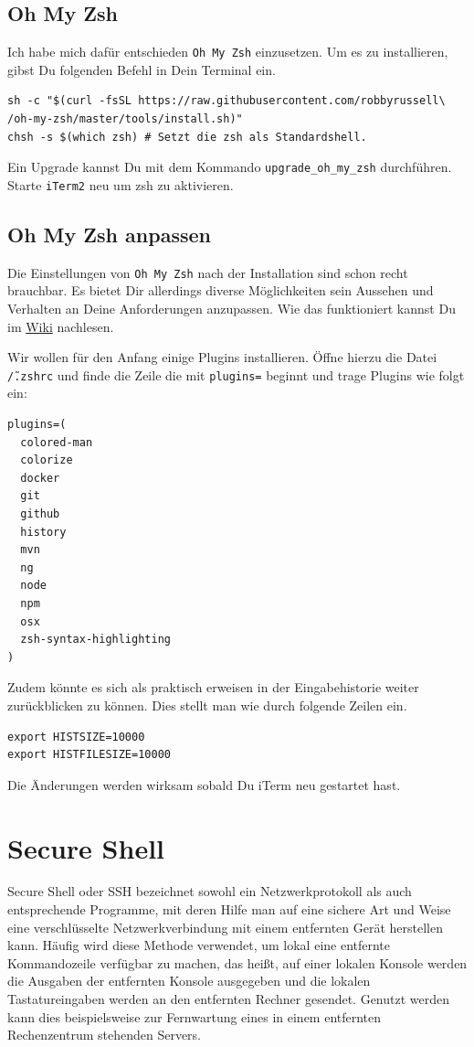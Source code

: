 \documentclass[]{article}
\newcommand{\code}[1]{\texttt{#1}}
\begin{document}
\subsection{Oh My Zsh}
Ich habe mich dafür entschieden \code{Oh My Zsh} einzusetzen. Um es zu installieren, gibst Du folgenden Befehl in Dein Terminal ein.
\begin{verbatim}
sh -c "$(curl -fsSL https://raw.githubusercontent.com/robbyrussell\
/oh-my-zsh/master/tools/install.sh)"
chsh -s $(which zsh) # Setzt die zsh als Standardshell.
\end{verbatim}

Ein Upgrade kannst Du mit dem Kommando \code{upgrade\_oh\_my\_zsh} durchführen. Starte \code{iTerm2} neu um zsh zu aktivieren.

\subsection{Oh My Zsh anpassen}
Die Einstellungen von \code{Oh My Zsh} nach der Installation sind schon recht brauchbar. Es bietet Dir allerdings diverse Möglichkeiten sein Aussehen und Verhalten an Deine Anforderungen anzupassen. Wie das funktioniert kannst Du im \href{https://github.com/robbyrussell/oh-my-zsh/wiki}{Wiki} nachlesen.

Wir wollen für den Anfang einige Plugins installieren. Öffne hierzu die Datei \code{\~/.zshrc} und finde die Zeile die mit \code{plugins=} beginnt und trage Plugins wie folgt ein:
\begin{verbatim}
plugins=(
  colored-man 
  colorize  
  docker 
  git 
  github 
  history 
  mvn 
  ng 
  node 
  npm 
  osx 
  zsh-syntax-highlighting
)
\end{verbatim}

Zudem könnte es sich als praktisch erweisen in der Eingabehistorie weiter zurückblicken zu können. Dies stellt man wie durch folgende Zeilen ein.

\begin{verbatim}
export HISTSIZE=10000
export HISTFILESIZE=10000
\end{verbatim}

Die Änderungen werden wirksam sobald Du iTerm neu gestartet hast.


\section{Secure Shell}
Secure Shell oder SSH bezeichnet sowohl ein Netzwerkprotokoll als auch entsprechende Programme, mit deren Hilfe man auf eine sichere Art und Weise eine verschlüsselte Netzwerkverbindung mit einem entfernten Gerät herstellen kann. Häufig wird diese Methode verwendet, um lokal eine entfernte Kommandozeile verfügbar zu machen, das heißt, auf einer lokalen Konsole werden die Ausgaben der entfernten Konsole ausgegeben und die lokalen Tastatureingaben werden an den entfernten Rechner gesendet. Genutzt werden kann dies beispielsweise zur Fernwartung eines in einem entfernten Rechenzentrum stehenden Servers.\cite{wikipediaSecureShell}
\end{document}
